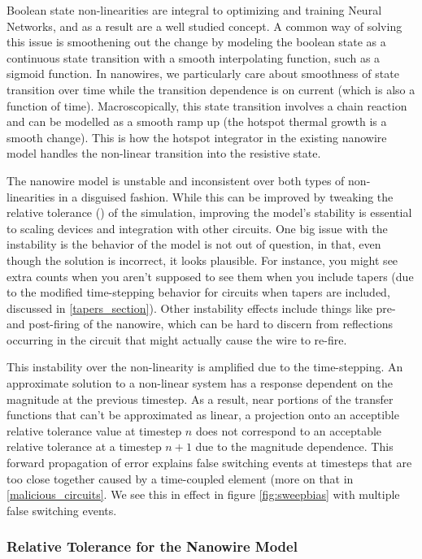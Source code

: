 Boolean state non-linearities are integral to optimizing and training Neural Networks, and as a 
result are a well studied concept. A common way of solving this issue is smoothening out the 
change by modeling the boolean state as a continuous state transition with a smooth interpolating
function, such as a sigmoid function. In nanowires, we particularly care about smoothness of state
transition over time while the transition dependence is on current (which is also a function of time).
Macroscopically, this state transition involves a chain reaction and can be modelled as a smooth
ramp up (the hotspot thermal growth is a smooth change). This is how the hotspot integrator in the 
existing nanowire model handles the non-linear transition into the resistive state.

The nanowire model is unstable and inconsistent over both types of non-linearities in a disguised 
fashion. While this can be improved by tweaking the relative tolerance () 
of the simulation, improving the model's stability is essential to scaling devices and integration 
with other circuits.
One big issue with the instability is the behavior of the model is not out of question, in that,
even though the solution is incorrect, it looks plausible. For instance, you might see extra counts
when you aren't supposed to see them when you include tapers (due to the modified time-stepping behavior
for circuits when tapers are included, discussed in \ref{tapers_section}). Other instability effects
include things like pre- and post-firing of the nanowire, which can be hard to discern from reflections
occurring in the circuit that might actually cause the wire to re-fire.

This instability over the non-linearity is amplified due to the time-stepping. An approximate 
solution to a non-linear system has a response dependent on the magnitude at the previous timestep. 
As a result,
near portions of the transfer functions that can't be approximated as linear, a projection
onto an acceptible relative tolerance value at timestep $n$ does not correspond to an
acceptable relative tolerance at a timestep $n+1$ due to the magnitude dependence.
This forward propagation of error explains false switching events at timesteps that
are too close together caused by a time-coupled element (more on that in \ref{malicious_circuits}.
We see this in effect in figure \ref{fig:sweepbias} with multiple false switching events.

\subsubsection{Relative Tolerance for the Nanowire Model} \label{reltol}

